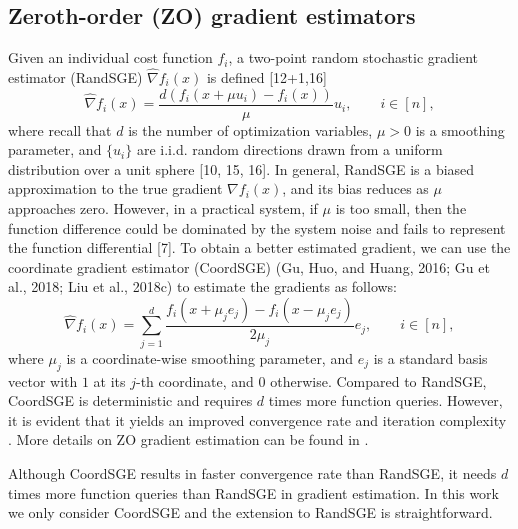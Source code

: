 \documentclass{article}
\theoremstyle{definition}
\theoremstyle{remark}
\begin{document}
\subsection{Zeroth-order (ZO) gradient estimators}

{\color{Brown}
Given an individual cost function $f_i$, a two-point random stochastic gradient estimator (RandSGE) $\hat{\nabla} f_i(x)$ is defined [12+1,16]
\begin{equation}\label{gradestrand}
\hat{\nabla} f_i(x) = \frac{d(f_i(x+\mu u_i) - f_i(x))}{\mu}u_i,\qquad i\in [n],
\end{equation}
where recall that $d$ is the number of optimization variables, $\mu > 0$ is a smoothing parameter, and
$\{u_i\}$ are i.i.d. random directions drawn from a uniform distribution over a unit sphere [10, 15, 16]. In general, RandSGE is a biased approximation to the true gradient $\nabla f_i(x)$, and its bias reduces as $\mu$ approaches zero. However, in a practical system, if $\mu$ is too small, then the function difference
could be dominated by the system noise and fails to represent the function differential [7].}
{\color{Green}
To obtain a better estimated gradient, we
can use the coordinate gradient estimator
(CoordSGE) (Gu, Huo, and Huang, 2016; Gu et al., 2018; Liu et al., 2018c) to estimate the gradients as follows:
\begin{equation}\label{gradestcoord}
\hat{\nabla} f_i(x) = \sum_{j=1}^d \frac{f_i(x+\mu_je_j) - f_i(x-\mu_je_j)}{2\mu_j}e_j,\qquad i\in [n],
\end{equation}
where $\mu_j$ is a coordinate-wise smoothing parameter, and $e_j$ is a standard basis vector with $1$ at its $j$-th coordinate,
and $0$ otherwise. 
}
{\color{Brown}
Compared to RandSGE, CoordSGE is deterministic and requires $d$ times more function queries. 
However, it is evident that it yields an improved  convergence rate and iteration complexity \cite{}. More details on ZO gradient estimation can be found in \cite{}.
}
 

Although CoordSGE results in faster convergence rate than RandSGE, it needs $d$ times more function queries than RandSGE in
gradient estimation. {\color{red} In this work we only consider CoordSGE and the extension to RandSGE is straightforward.}
\end{document}
